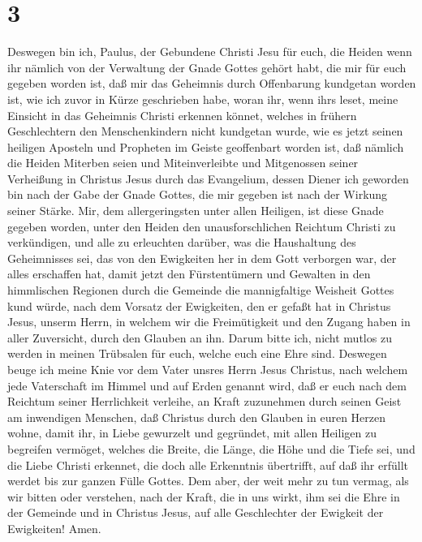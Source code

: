\hypertarget{section-2}{%
\section{3}\label{section-2}}

 Deswegen bin ich, Paulus, der Gebundene Christi Jesu für
euch, die Heiden  wenn ihr nämlich von der Verwaltung der
Gnade Gottes gehört habt, die mir für euch gegeben worden ist,
 daß mir das Geheimnis durch Offenbarung kundgetan worden
ist, wie ich zuvor in Kürze geschrieben habe,  woran ihr,
wenn ihr\textquotesingle s leset, meine Einsicht in das Geheimnis
Christi erkennen könnet,  welches in frühern Geschlechtern
den Menschenkindern nicht kundgetan wurde, wie es jetzt seinen heiligen
Aposteln und Propheten im Geiste geoffenbart worden ist, 
daß nämlich die Heiden Miterben seien und Miteinverleibte und
Mitgenossen seiner Verheißung in Christus Jesus durch das Evangelium,
 dessen Diener ich geworden bin nach der Gabe der Gnade
Gottes, die mir gegeben ist nach der Wirkung seiner Stärke.
 Mir, dem allergeringsten unter allen Heiligen, ist diese
Gnade gegeben worden, unter den Heiden den unausforschlichen Reichtum
Christi zu verkündigen,  und alle zu erleuchten darüber,
was die Haushaltung des Geheimnisses sei, das von den Ewigkeiten her in
dem Gott verborgen war, der alles erschaffen hat,  damit
jetzt den Fürstentümern und Gewalten in den himmlischen Regionen durch
die Gemeinde die mannigfaltige Weisheit Gottes kund würde,
 nach dem Vorsatz der Ewigkeiten, den er gefaßt hat in
Christus Jesus, unserm Herrn,  in welchem wir die
Freimütigkeit und den Zugang haben in aller Zuversicht, durch den
Glauben an ihn.  Darum bitte ich, nicht mutlos zu werden
in meinen Trübsalen für euch, welche euch eine Ehre sind.
 Deswegen beuge ich meine Knie vor dem Vater unsres Herrn
Jesus Christus,  nach welchem jede Vaterschaft im Himmel
und auf Erden genannt wird,  daß er euch nach dem
Reichtum seiner Herrlichkeit verleihe, an Kraft zuzunehmen durch seinen
Geist am inwendigen Menschen,  daß Christus durch den
Glauben in euren Herzen wohne, damit ihr, in Liebe gewurzelt und
gegründet,  mit allen Heiligen zu begreifen vermöget,
welches die Breite, die Länge, die Höhe und die Tiefe sei,
 und die Liebe Christi erkennet, die doch alle Erkenntnis
übertrifft, auf daß ihr erfüllt werdet bis zur ganzen Fülle Gottes.
 Dem aber, der weit mehr zu tun vermag, als wir bitten
oder verstehen, nach der Kraft, die in uns wirkt,  ihm
sei die Ehre in der Gemeinde und in Christus Jesus, auf alle
Geschlechter der Ewigkeit der Ewigkeiten! Amen.


